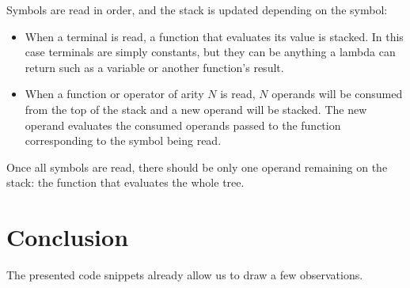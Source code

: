 \documentclass[../main]{subfiles}
\begin{document}
Symbols are read in order, and the stack is updated depending on the symbol:

\begin{itemize}
\item When a terminal is read, a function that evaluates its value is stacked.
In this case terminals are simply constants, but they can be anything a \cpp
lambda can return such as a variable or another function's result.

\item When a function or operator of arity $N$ is read, $N$ operands will be
consumed from the top of the stack and a new operand will be stacked.
The new operand evaluates the consumed operands passed to the function
corresponding to the symbol being read.
\end{itemize}

Once all symbols are read, there should be only one operand remaining
on the stack: the function that evaluates the whole tree.

\section{
  Conclusion
}

The presented code snippets already allow us to draw a few observations.
\end{document}
